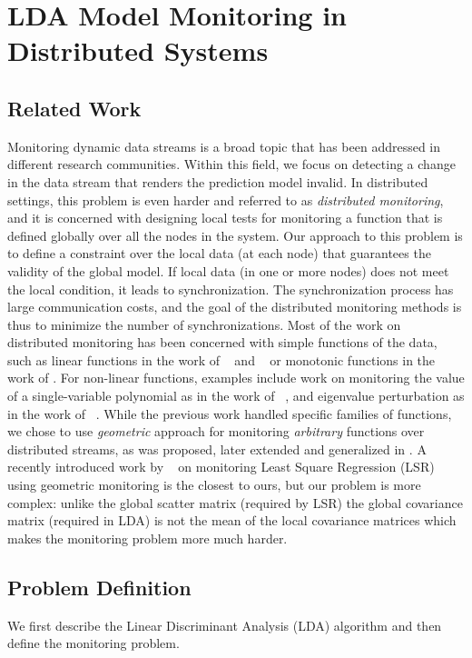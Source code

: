 \chapter{LDA Model Monitoring in Distributed Systems}
\label{chap:secondchap}

\section{Related Work}
Monitoring dynamic data streams is a broad topic that has been addressed in different research communities. Within this field, we focus on detecting a change in the data stream that renders the prediction model invalid. 
In distributed settings, this problem is even harder and referred to as \textit{distributed monitoring}, and it is concerned with designing local tests for monitoring a function that is defined globally over all the nodes in the system.
Our approach to this problem is to define a constraint over the local data (at each node) that guarantees the validity of the global model. If local data (in one or more nodes) does not meet the local condition, it leads to synchronization. The synchronization process has large communication costs, and the goal of the distributed monitoring methods is thus to minimize the number of synchronizations. Most of the work on distributed monitoring has been concerned with simple functions of the data, such as linear functions in the work of ~\cite{keralapura2006communication} and ~\cite{kashyap2008efficient} or monotonic functions in the work of \cite{michel2005klee}.
For non-linear functions, examples include work on monitoring the value
of a single-variable polynomial as in the work of ~\cite{shah2008handling},
and eigenvalue perturbation as in the work of ~\cite{huang2007communication}.
While the previous work handled specific families of functions, we chose to use \textit{geometric} approach for monitoring \textit{arbitrary} functions over distributed streams, as was proposed, later extended and generalized in \cite{sharfman2007geometric, keren2014geometric, keren2012shape}. A recently introduced work by ~\cite{gabel2015monitoring} on monitoring Least Square Regression (LSR) using geometric monitoring is the closest to ours, but our problem is more complex: unlike the global scatter matrix (required by LSR) the global covariance matrix (required in LDA) is not the mean of the local covariance matrices which makes the monitoring problem more much harder.

\section{Problem Definition}
We first describe the Linear Discriminant Analysis (LDA) algorithm and then define the monitoring problem. 

